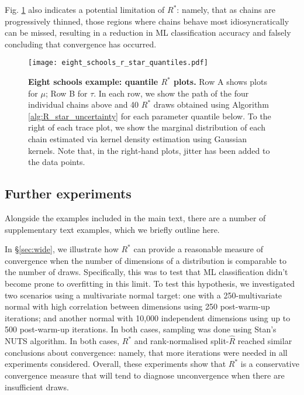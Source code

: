 \documentclass{article}
\begin{document}
Fig. \ref{fig:eight_schools_r_star_quantiles} also indicates a potential limitation of $R^*$: namely, that as chains are progressively thinned, those regions where chains behave most idiosyncratically can be missed, resulting in a reduction in ML classification accuracy and falsely concluding that convergence has occurred.

\begin{figure}[!htb]
	\centerline{\texttt{[image: eight\_schools\_r\_star\_quantiles.pdf]}}
	\caption{\textbf{Eight schools example: quantile $R^*$ plots.} Row A shows plots for $\mu$; Row B for $\tau$. In each row, we show the path of the four individual chains above and 40 $R^*$ draws obtained using Algorithm \ref{alg:R_star_uncertainty} for each parameter quantile below. To the right of each trace plot, we show the marginal distribution of each chain estimated via kernel density estimation using Gaussian kernels. Note that, in the right-hand plots, jitter has been added to the data points.}
	\label{fig:eight_schools_r_star_quantiles}
\end{figure}


\subsection{Further experiments}\label{sec:further_experiments}
Alongside the examples included in the main text, there are a number of supplementary text examples, which we briefly outline here.

In \S\ref{sec:wide}, we illustrate how $R^*$ can provide a reasonable measure of convergence when the number of dimensions of a distribution is comparable to the number of draws. Specifically, this was to test that ML classification didn't become prone to overfitting in this limit. To test this hypothesis, we investigated two scenarios using a multivariate normal target: one with a 250-multivariate normal with high correlation between dimensions using 250 post-warm-up iterations; and another normal with 10,000 independent dimensions using up to 500 post-warm-up iterations. In both cases, sampling was done using Stan's NUTS algorithm. In both cases, $R^*$ and rank-normalised split-$\widehat{R}$ reached similar conclusions about convergence: namely, that more iterations were needed in all experiments considered. Overall, these experiments show that $R^*$ is a conservative convergence measure that will tend to diagnose unconvergence when there are insufficient draws.
\end{document}
